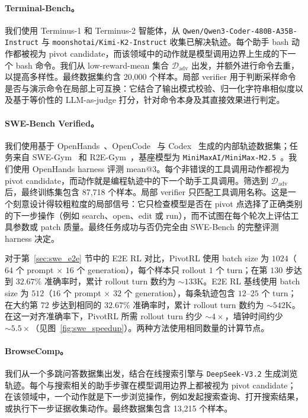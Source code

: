 \paragraph{Terminal-Bench。}
我们使用 Terminus-1 和 Terminus-2 智能体，从 \texttt{Qwen/Qwen3-Coder-480B-A35B-Instruct} 与 \texttt{moonshotai/Kimi-K2-Instruct} 收集已解决轨迹。每个助手 bash 动作都被视为 pivot candidate，而该领域中的动作就是模型调用边界上生成的下一个 bash 命令。我们从 low-reward-mean 集合 $\mathcal{D}_{\mathrm{adv}}$ 出发，并额外进行命令去重，以提高多样性。最终数据集约含 20{,}000 个样本。局部 verifier 用于判断采样命令是否与演示命令在局部上可互换：它结合了输出模式校验、归一化字符串相似度以及基于等价性的 LLM-as-judge 打分，针对命令本身及其直接效果进行判定。

\paragraph{SWE-Bench Verified。}
我们使用基于 OpenHands~\citep{wang2025openhandsopenplatformai}、OpenCode~\citep{opencode} 与 Codex~\citep{openaicodex_software} 生成的内部轨迹数据集；任务来自 SWE-Gym~\citep{pan2025trainingsoftwareengineeringagents} 和 R2E-Gym~\citep{jain2025r2egymproceduralenvironmentshybrid}，基座模型为 \texttt{MiniMaxAI/MiniMax-M2.5}~\citep{minimax2026m25}。我们使用 OpenHands harness 评测 mean@3。每个非错误的工具调用动作都视为 pivot candidate，而动作就是编程轨迹中的下一个助手工具调用。筛选到 $\mathcal{D}_{\mathrm{adv}}$ 后，最终训练集包含 87{,}718 个样本。局部 verifier 只匹配工具调用名称。这是一个刻意设计得较粗粒度的局部信号：它只检查模型是否在 pivot 点选择了正确类别的下一步操作（例如 search、open、edit 或 run），而不试图在每个轮次上评估工具参数或 patch 质量。最终任务成功与否仍完全由 SWE-Bench 的完整评测 harness 决定。

对于第~\ref{sec:swe_e2e} 节中的 E2E RL 对比，PivotRL 使用 batch size 为 $1024$（$64$ 个 prompt $\times$ $16$ 个 generation），每个样本只 rollout $1$ 个 turn；在第 $130$ 步达到 $32.67\%$ 准确率时，累计 rollout turn 数约为 ${\sim}133$K。E2E RL 基线使用 batch size 为 $512$（$16$ 个 prompt $\times$ $32$ 个 generation），每条轨迹包含 $12$--$25$ 个 turn；在大约第 $72$ 步达到相同的 $32.67\%$ 准确率时，累计 rollout turn 数约为 ${\sim}542$K。在这一对齐准确率下，PivotRL 所需 rollout turn 约少 ${\sim}4\times$，墙钟时间约少 ${\sim}5.5\times$（见图~\ref{fig:swe_speedup}）。两种方法使用相同数量的计算节点。

\paragraph{BrowseComp。}
我们从一个多跳问答数据集出发，结合在线搜索引擎与 \texttt{DeepSeek-V3.2} 生成浏览轨迹。每个与搜索相关的助手步骤在模型调用边界上都被视为 pivot candidate；在该领域中，一个动作就是下一步浏览操作，例如发起搜索查询、打开搜索结果，或执行下一步证据收集动作。最终数据集包含 13{,}215 个样本。

